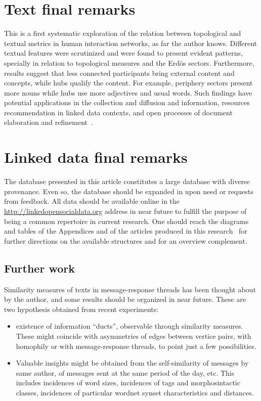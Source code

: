 \section{Text final remarks}\label{sec:remarks}
This is a first systematic exploration of the relation between topological and textual
metrics in human interaction networks, as far the author knows.
Different textual features were scrutinized and were found to present
evident patterns, specially in relation to topological measures and the Erd\"os sectors.
Furthermore, results suggest that less connected participants bring external content and concepts,
while hubs qualify the content.
For example, periphery sectors present more nouns while hubs use more adjectives and usual words.
Such findings have potential applications in the collection and diffusion and information,
resources recommendation in linked data contexts,
and open processes of document elaboration and refinement~\cite{ensaio,OPS,pnud5,evoSN,pbr}.

\section{Linked data final remarks}
The database presented in this article
constitutes a large database with diverse provenance.
Even so, the database should be expanded in upon need or requests from feedback.
All data should be available online in the \url{http://linkedopensocialdata.org}
address in near future to fulfill the purpose of being a common
repertoire in current research.
One should reach the diagrams and tables of the 
Appendices and of the articles produced in this research~\cite{stab,text,vers,losd}
for further directions
on the available structures and for an overview complement.


\subsection{Further work}\label{subsec:fw}

Similarity measures of texts in message-response threads has been thought about by the author,
and some results should be organized in near future.
These are two hypothesis obtained from recent experiments:
\begin{itemize}
    \item existence of information ``ducts'', observable through similarity measures.
	    These might coincide with asymmetries of edges between vertice pairs,
		with homophily or with message-response threads, to point just a few possibilities.
    \item Valuable insights might be obtained from the self-similarity of messages by same author,
	    of messages sent at the same period of the day, etc.
	    This includes incidences of word sizes, incidences of tags and morphosintactic classes,
	    incidences of particular wordnet synset characteristics and distances.
\end{itemize}

